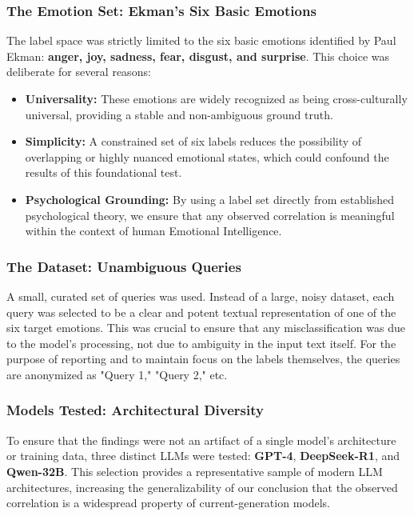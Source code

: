 \subsubsection{The Emotion Set: Ekman's Six Basic Emotions}
The label space was strictly limited to the six basic emotions identified by Paul Ekman\cite{ekman}: \textbf{anger, joy, sadness, fear, disgust, and surprise}. This choice was deliberate for several reasons:
\begin{itemize}
    \item \textbf{Universality:} These emotions are widely recognized as being cross-culturally universal, providing a stable and non-ambiguous ground truth.
    \item \textbf{Simplicity:} A constrained set of six labels reduces the possibility of overlapping or highly nuanced emotional states, which could confound the results of this foundational test.
    \item \textbf{Psychological Grounding:} By using a label set directly from established psychological theory, we ensure that any observed correlation is meaningful within the context of human Emotional Intelligence.
\end{itemize}

\subsubsection{The Dataset: Unambiguous Queries}
A small, curated set of queries was used. Instead of a large, noisy dataset, each query was selected to be a clear and potent textual representation of one of the six target emotions. This was crucial to ensure that any misclassification was due to the model's processing, not due to ambiguity in the input text itself. For the purpose of reporting and to maintain focus on the labels themselves, the queries are anonymized as "Query 1," "Query 2," etc.

\subsubsection{Models Tested: Architectural Diversity}
To ensure that the findings were not an artifact of a single model's architecture or training data, three distinct LLMs were tested: \textbf{GPT-4}, \textbf{DeepSeek-R1}, and \textbf{Qwen-32B}. This selection provides a representative sample of modern LLM architectures, increasing the generalizability of our conclusion that the observed correlation is a widespread property of current-generation models.

